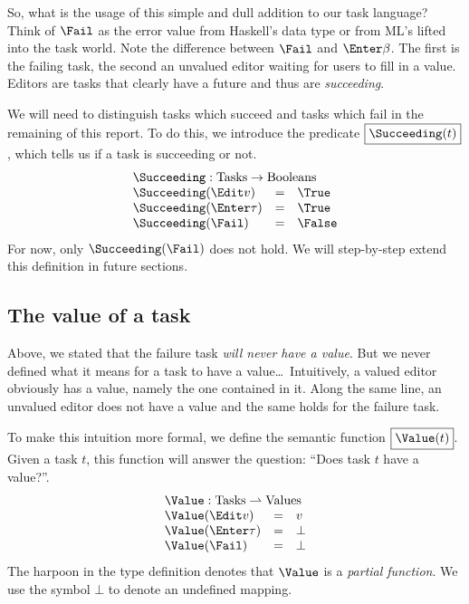 So, what is the usage of this simple and dull addition to our task language?
Think of $\Fail$ as the error value  from Haskell's  data type
or  from ML's  lifted into the task world.
Note the difference between $\Fail$ and $\Enter\beta$.
The first is the failing task,
the second an unvalued editor waiting for users to fill in a value.
Editors are tasks that clearly have a future and thus are \emph{succeeding}.

We will need to distinguish tasks which succeed and tasks which fail in the remaining of this report.
To do this,
we introduce the predicate $\boxed{\Succeeding(t)}$,
which tells us if a task is succeeding or not.
\begin{equation*}
  \begin{array}{lcl}
    \multicolumn{3}{l}{\Succeeding : \mathrm{Tasks} \to \mathrm{Booleans}} \\
    \Succeeding(\Edit v)     &=& \True \\
    \Succeeding(\Enter \tau) &=& \True \\
    \Succeeding(\Fail)       &=& \False
  \end{array}
\end{equation*}
For now,
only $\Succeeding(\Fail)$ does not hold.
We will step-by-step extend this definition in future sections.


\subsection{The value of a task}
\label{sec:value}

Above, we stated that the failure task \emph{will never have a value}.
But we never defined what it means for a task to have a value\ldots\
Intuitively,
a valued editor obviously has a value,
namely the one contained in it.
Along the same line,
an unvalued editor does not have a value
and the same holds for the failure task.

To make this intuition more formal,
we define the semantic function $\boxed{\Value(t)}$.
Given a task $t$, this function will answer the question:
\enquote{Does task $t$ have a value?}.
\begin{equation*}
  \begin{array}{lcl}
    \multicolumn{3}{l}{\Value : \mathrm{Tasks} \rightharpoonup \mathrm{Values}} \\
    \Value(\Edit v)     &=& v \\
    \Value(\Enter \tau) &=& \bot \\
    \Value(\Fail)       &=& \bot
  \end{array}
\end{equation*}
The harpoon in the type definition denotes that $\Value$ is a \emph{partial function}.
We use the symbol $\bot$ to denote an undefined mapping.

